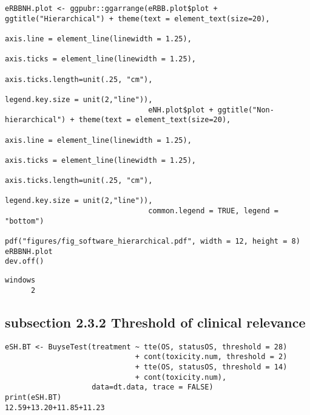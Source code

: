 \documentclass[12pt]{article}
\begin{document}
\lstset{language=r,label= ,caption= ,captionpos=b,numbers=none}
\begin{lstlisting}
eRBBNH.plot <- ggpubr::ggarrange(eRBB.plot$plot + ggtitle("Hierarchical") + theme(text = element_text(size=20), 
                                                                                  axis.line = element_line(linewidth = 1.25),
                                                                                  axis.ticks = element_line(linewidth = 1.25),
                                                                                  axis.ticks.length=unit(.25, "cm"),
                                                                                  legend.key.size = unit(2,"line")),
                                 eNH.plot$plot + ggtitle("Non-hierarchical") + theme(text = element_text(size=20), 
                                                                                     axis.line = element_line(linewidth = 1.25),
                                                                                     axis.ticks = element_line(linewidth = 1.25),
                                                                                     axis.ticks.length=unit(.25, "cm"),
                                                                                     legend.key.size = unit(2,"line")),
                                 common.legend = TRUE, legend = "bottom")

pdf("figures/fig_software_hierarchical.pdf", width = 12, height = 8)
eRBBNH.plot
dev.off()
\end{lstlisting}

\begin{verbatim}
windows 
      2
\end{verbatim}

\subsection{subsection 2.3.2 Threshold of clinical relevance}
\label{sec:org8fd7a69}
\lstset{language=r,label= ,caption= ,captionpos=b,numbers=none}
\begin{lstlisting}
eSH.BT <- BuyseTest(treatment ~ tte(OS, statusOS, threshold = 28)
                              + cont(toxicity.num, threshold = 2)
                              + tte(OS, statusOS, threshold = 14)
                              + cont(toxicity.num),
                    data=dt.data, trace = FALSE)
print(eSH.BT)
12.59+13.20+11.85+11.23
\end{lstlisting}
\end{document}
